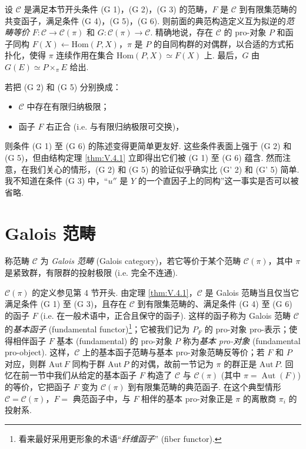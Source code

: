 \begin{theorem}\label{thm:V.4.1}
设 $\mathcal{C}$ 是满足本节开头条件 (G 1)，(G 2)，(G 3) 的范畴，$F$ 是 $\mathcal{C}$ 到有限集范畴的共变函子，满足条件 (G 4)，(G 5)，(G 6). 则前面的典范构造定义互为拟逆的\emph{范畴等价} $F \colon \mathcal{C} \to \mathcal{C}(\pi)$ 和 $G \colon \mathcal{C}(\pi) \to \mathcal{C}$. 精确地说，存在 $\mathcal{C}$ 的 pro-对象 $P$ 和函子同构 $F(X) \longleftarrow \mathrm{Hom}(P, X)$，$\pi$ 是 $P$ 的自同构群的对偶群，以合适的方式拓扑化，使得 $\pi$ 连续作用在集合 $\mathrm{Hom}(P, X) \simeq F(X)$ 上. 最后，$G$ 由 $G(E) \simeq P \times_\pi E$ 给出.
\end{theorem}

\begin{remark}\label{rem:V.4.2}
若把 (G 2) 和 (G 5) 分别换成：
\begin{itemize}\tightlist
\item[(G' 2)] $\mathcal{C}$ 中存在有限归纳极限；
\item[(G' 5)] 函子 $F$ 右正合 (i.e. 与有限归纳极限可交换)，
\end{itemize}
则条件 (G 1) 至 (G 6) 的陈述变得更简单更友好. 这些条件表面上强于 (G 2) 和 (G 5)，但由结构定理 \ref{thm:V.4.1} 立即得出它们被 (G 1) 至 (G 6) 蕴含. 然而注意，在我们关心的情形，(G 2) 和 (G 5) 的验证似乎确实比 (G' 2) 和 (G' 5) 简单. 我不知道在条件 (G 3) 中，``$u''$ 是 $Y$ 的一个直因子上的同构''这一事实是否可以被省略.
\end{remark}

\section{Galois 范畴}

\begin{definition}\label{def:V.5.1}
称范畴 $\mathcal{C}$ 为 \emph{Galois 范畴} (Galois category)，若它等价于某个范畴 $\mathcal{C}(\pi)$，其中 $\pi$ 是紧致群，有限群的投射极限 (i.e. 完全不连通).
\end{definition}

$\mathcal{C}(\pi)$ 的定义参见第 4 节开头. 由定理 \ref{thm:V.4.1}，$\mathcal{C}$ 是 Galois 范畴当且仅当它满足条件 (G 1) 至 (G 3)，且存在 $\mathcal{C}$ 到有限集范畴的、满足条件 (G 4) 至 (G 6) 的函子 $F$ (i.e. 在一般术语中，正合且保守的函子). 这样的函子称为 Galois 范畴 $\mathcal{C}$ 的\emph{基本函子} (fundamental functor)\footnote{看来最好采用更形象的术语``\emph{纤维函子}'' (fiber functor).}；它被我们记为 $P_F$ 的 pro-对象 pro-表示；使得相伴函子 $F$ 基本 (fundamental) 的 pro-对象 $P$ 称为\emph{基本 pro-对象} (fundamental pro-object). 这样，$\mathcal{C}$ 上的基本函子范畴与基本 pro-对象范畴反等价；若 $F$ 和 $P$ 对应，则群 $\mathrm{Aut}\, F$ 同构于群 $\mathrm{Aut}\, P$ 的对偶，故前一节记为 $\pi$ 的群正是 $\mathrm{Aut}\, P$. 回忆在前一节中我们从给定的基本函子 $F$ 构造了 $\mathcal{C}$ 与 $\mathcal{C}(\pi)$ (其中 $\pi = \operatorname{Aut}(F)$) 的等价，它把函子 $F$ 变为 $\mathcal{C}(\pi)$ 到有限集范畴的典范函子. 在这个典型情形 $\mathcal{C} = \mathcal{C}(\pi)$，$F =$ 典范函子中，与 $F$ 相伴的基本 pro-对象正是 $\pi$ 的离散商 $\pi_i$ 的投射系.

